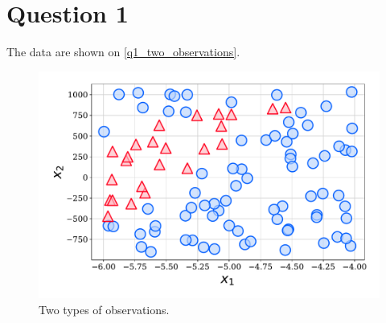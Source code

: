 \section{Question 1}

The data are shown on \autoref{q1_two_observations}.

\begin{figure}[!ht]
  \centering
  \includegraphics[width=1\textwidth]{figures/q1.pdf}
  \caption{Two types of observations.}
  \label{q1_two_observations}
\end{figure}
